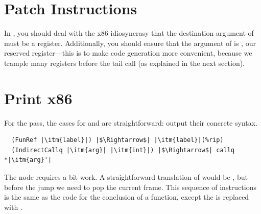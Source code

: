 \documentclass[11pt]{book}
\begin{document}
\section{Patch Instructions}

In , you should deal with the x86
idiosyncrasy that the destination argument of  must be a
register. Additionally, you should ensure that the argument of
 is , our reserved register---this is to make
code generation more convenient, because we trample many registers
before the tail call (as explained in the next section).

\section{Print x86}

For the  pass, the cases for  and
 are straightforward: output their concrete
syntax.
\begin{lstlisting}
  (FunRef |\itm{label}|) |$\Rightarrow$| |\itm{label}|(%rip)
  (IndirectCallq |\itm{arg}| |\itm{int}|) |$\Rightarrow$| callq *|\itm{arg}'|
\end{lstlisting}

The  node requires a bit work. A straightforward
translation of  would be , but
before the jump we need to pop the current frame. This sequence of
instructions is the same as the code for the conclusion of a function,
except the  is replaced with .
\end{document}
